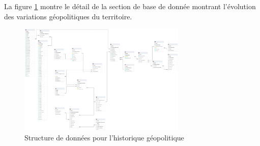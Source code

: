     La figure \ref{fig:offstreet_db_erd_history} montre le détail de la section de base de donnée montrant l'évolution des variations géopolitiques du territoire.
    \begin{figure}
        \centering
        \includegraphics[trim={15cm 55cm 60cm 10cm}, clip, width=8cm]{images/structure_base_de_donnee.png}
        \caption{Structure de données pour l'historique géopolitique}\label{fig:offstreet_db_erd_history}
    \end{figure}
    \FloatBarrier
    
